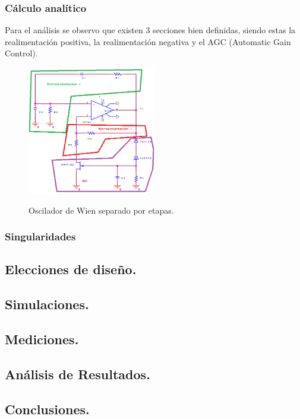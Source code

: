\subsubsection{Cálculo analítico}
Para el análisis se observo que existen 3 secciones bien definidas, siendo estas la realimentación positiva, la realimentación negativa y el AGC (Automatic Gain Control).
\begin{figure}[H]
	\centering
	\includegraphics[width=0.5\textwidth]{Imagenes-Ej1/oscCatedraEtapas.PNG}
	\label{fig:cirosc}
	\caption{Oscilador de Wien separado por etapas.}
\end{figure}

\subsubsection{Singularidades}
\subsection{Elecciones de diseño.}
\subsection{Simulaciones.}
\subsection{Mediciones.}
\subsection{Análisis de Resultados.}
\subsection{Conclusiones.}


